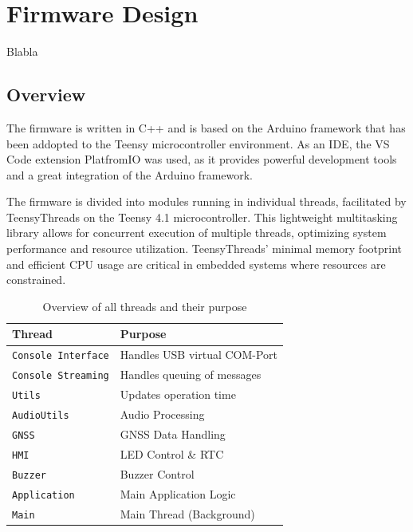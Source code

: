 \newpage
\section{Firmware Design}
Blabla

\subsection{Overview}
The firmware is written in C++ and is based on the Arduino framework that has been addopted to the Teensy microcontroller environment.
As an IDE, the VS Code extension PlatfromIO was used, as it provides powerful development tools and a great integration of the Arduino framework.

The firmware is divided into modules running in individual threads, facilitated by TeensyThreads on the Teensy 4.1 microcontroller.
This lightweight multitasking library allows for concurrent execution of multiple threads, optimizing system performance and resource utilization.
TeensyThreads' minimal memory footprint and efficient CPU usage are critical in embedded systems where resources are constrained.


\begin{table}[h]
	\centering
	\begin{tabular}{|l|l|}
		\hline
		Thread                     & Purpose                      \\ \hline
		\texttt{Console Interface} & Handles USB virtual COM-Port \\ \hline
		\texttt{Console Streaming} & Handles queuing of messages  \\ \hline
		\texttt{Utils}             & Updates operation time       \\ \hline
		\texttt{AudioUtils}        & Audio Processing             \\ \hline
		\texttt{GNSS}              & GNSS Data Handling           \\ \hline
		\texttt{HMI}               & LED Control \& RTC           \\ \hline
		\texttt{Buzzer}            & Buzzer Control               \\ \hline
		\texttt{Application}       & Main Application Logic       \\ \hline
		\texttt{Main}              & Main Thread (Background)     \\ \hline
	\end{tabular}
	\caption{Overview of all threads and their purpose}
	\label{tab:threads}
\end{table}


